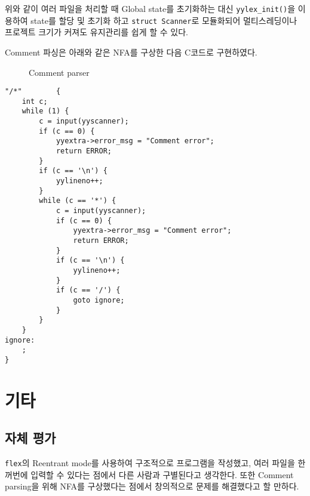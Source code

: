 \documentclass[a4paper, 10pt]{oblivoir}
\begin{document}
위와 같이 여러 파일을 처리할 때 Global state를 초기화하는 대신 \texttt{yylex\_init()}을 이용하여 state를 할당 및 초기화 하고 \texttt{struct Scanner}로 모듈화되어 멀티스레딩이나 프로젝트 크기가 커져도 유지관리를 쉽게 할 수 있다.

Comment 파싱은 아래와 같은 NFA를 구상한 다음 C코드로 구현하였다.

\begin{figure}
\caption{Comment parser}
\end{figure}

\begin{lstlisting}[caption=Segment of tiny.l, frame=single]
"/*"        {
    int c;
    while (1) {
        c = input(yyscanner);
        if (c == 0) {
            yyextra->error_msg = "Comment error";
            return ERROR;
        }
        if (c == '\n') {
            yylineno++;
        }
        while (c == '*') {
            c = input(yyscanner);
            if (c == 0) {
                yyextra->error_msg = "Comment error";
                return ERROR;
            }
            if (c == '\n') {
                yylineno++;
            }
            if (c == '/') {
                goto ignore;
            }
        }
    }
ignore:
    ;
}
\end{lstlisting}

\section{기타}
\subsection{자체 평가}
\texttt{flex}의 Reentrant mode를 사용하여 구조적으로 프로그램을 작성했고, 여러 파일을 한꺼번에 입력할 수 있다는 점에서 다른 사람과 구별된다고 생각한다. 또한 Comment parsing을 위해 NFA를 구상했다는 점에서 창의적으로 문제를 해결했다고 할 만하다.
\end{document}
